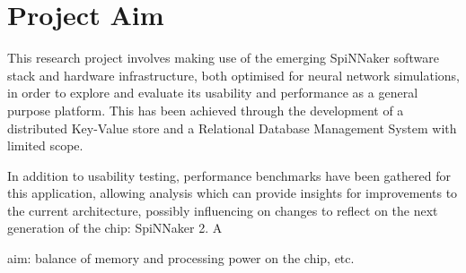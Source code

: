 \section{Project Aim}
\label{sec:aim}

This research project involves making use of the emerging SpiNNaker software stack and hardware infrastructure, both optimised for neural network simulations, in order to explore and evaluate its usability and performance as a general purpose platform. This has been achieved through the development of a distributed Key-Value store and a Relational Database Management System with limited scope.

In addition to usability testing, performance benchmarks have been gathered for this application, allowing analysis which can provide insights for improvements to the current architecture, possibly influencing on changes to reflect on the next generation of the chip: SpiNNaker 2. A 

aim: balance of memory and processing power on the chip, etc.
